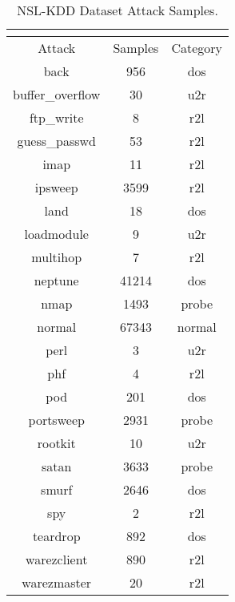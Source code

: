 \begin{longtable}{@{}ccc@{}}
\caption{NSL-KDD Dataset Attack Samples.} \\
\label{nslkddattacksamples} \\
\toprule
Attack & Samples & Category  \\
\midrule
back & 956 & dos \\ 
buffer\_overflow & 30 & u2r \\ 
ftp\_write & 8 & r2l \\ 
guess\_passwd & 53 & r2l \\ 
imap & 11 & r2l \\ 
ipsweep & 3599 & r2l \\ 
land & 18 & dos \\ 
loadmodule & 9 & u2r \\ 
multihop & 7 & r2l \\ 
neptune & 41214 & dos \\ 
nmap & 1493 & probe \\ 
normal & 67343 & normal \\ 
perl & 3 & u2r \\ 
phf & 4 & r2l \\ 
pod & 201 & dos \\ 
portsweep & 2931 & probe \\ 
rootkit & 10 & u2r \\ 
satan & 3633 & probe \\ 
smurf & 2646 & dos \\ 
spy & 2 & r2l \\ 
teardrop & 892 & dos \\ 
warezclient & 890 & r2l \\ 
warezmaster & 20 & r2l \\ 
\bottomrule
\end{longtable}
